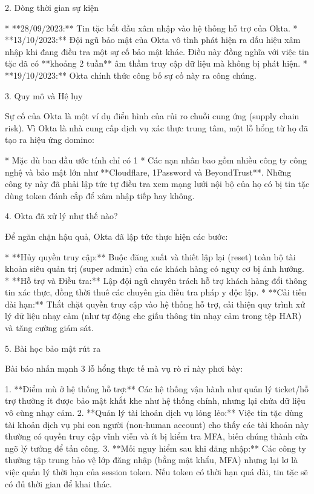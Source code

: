 2. Dòng thời gian sự kiện

* **28/09/2023:** Tin tặc bắt đầu xâm nhập vào hệ thống hỗ trợ của Okta.
* **13/10/2023:** Đội ngũ bảo mật của Okta vô tình phát hiện ra dấu hiệu xâm nhập khi đang điều tra một sự cố bảo mật khác. Điều này đồng nghĩa với việc tin tặc đã có **khoảng 2 tuần** âm thầm truy cập dữ liệu mà không bị phát hiện.
* **19/10/2023:** Okta chính thức công bố sự cố này ra công chúng.

3. Quy mô và Hệ lụy

Sự cố của Okta là một ví dụ điển hình của rủi ro chuỗi cung ứng (supply chain risk). Vì Okta là nhà cung cấp dịch vụ xác thực trung tâm, một lỗ hổng từ họ đã tạo ra hiệu ứng domino:

* Mặc dù ban đầu ước tính chỉ có 1%
* Các nạn nhân bao gồm nhiều công ty công nghệ và bảo mật lớn như **Cloudflare, 1Password và BeyondTrust**. Những công ty này đã phải lập tức tự điều tra xem mạng lưới nội bộ của họ có bị tin tặc dùng token đánh cắp để xâm nhập tiếp hay không.

4. Okta đã xử lý như thế nào?

Để ngăn chặn hậu quả, Okta đã lập tức thực hiện các bước:

* **Hủy quyền truy cập:** Buộc đăng xuất và thiết lập lại (reset) toàn bộ tài khoản siêu quản trị (super admin) của các khách hàng có nguy cơ bị ảnh hưởng.
* **Hỗ trợ và Điều tra:** Lập đội ngũ chuyên trách hỗ trợ khách hàng đổi thông tin xác thực, đồng thời thuê các chuyên gia điều tra pháp y độc lập.
* **Cải tiến dài hạn:** Thắt chặt quyền truy cập vào hệ thống hỗ trợ, cải thiện quy trình xử lý dữ liệu nhạy cảm (như tự động che giấu thông tin nhạy cảm trong tệp HAR) và tăng cường giám sát.

5. Bài học bảo mật rút ra

Bài báo nhấn mạnh 3 lỗ hổng thực tế mà vụ rò rỉ này phơi bày:

1. **Điểm mù ở hệ thống hỗ trợ:** Các hệ thống vận hành như quản lý ticket/hỗ trợ thường ít được bảo mật khắt khe như hệ thống chính, nhưng lại chứa dữ liệu vô cùng nhạy cảm.
2. **Quản lý tài khoản dịch vụ lỏng lẻo:** Việc tin tặc dùng tài khoản dịch vụ phi con người (non-human account) cho thấy các tài khoản này thường có quyền truy cập vĩnh viễn và ít bị kiểm tra MFA, biến chúng thành cửa ngõ lý tưởng để tấn công.
3. **Mối nguy hiểm sau khi đăng nhập:** Các công ty thường tập trung bảo vệ lớp đăng nhập (bằng mật khẩu, MFA) nhưng lại lơ là việc quản lý thời hạn của session token. Nếu token có thời hạn quá dài, tin tặc sẽ có đủ thời gian để khai thác.

